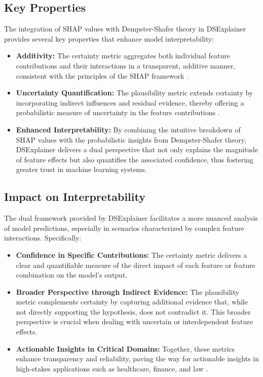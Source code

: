 \documentclass[acmlarge]{acmart}
\begin{document}
\subsection{Key Properties}

The integration of SHAP values with Dempster-Shafer theory in DSExplainer provides several key properties that enhance model interpretability:

\begin{itemize}
    \item \textbf{Additivity:} The certainty metric aggregates both individual feature contributions and their interactions in a transparent, additive manner, consistent with the principles of the SHAP framework \cite{shapley1953value}.
    \item \textbf{Uncertainty Quantification:} The plausibility metric extends certainty by incorporating indirect influences and residual evidence, thereby offering a probabilistic measure of uncertainty in the feature contributions \cite{shafer1976mathematical}.
    \item \textbf{Enhanced Interpretability:} By combining the intuitive breakdown of SHAP values with the probabilistic insights from Dempster-Shafer theory, DSExplainer delivers a dual perspective that not only explains the magnitude of feature effects but also quantifies the associated confidence, thus fostering greater trust in machine learning systems.
\end{itemize}

\subsection{Impact on Interpretability}

The dual framework provided by DSExplainer facilitates a more nuanced analysis of model predictions, especially in scenarios characterized by complex feature interactions. Specifically:

\begin{itemize}
    \item \textbf{Confidence in Specific Contributions:} The certainty metric delivers a clear and quantifiable measure of the direct impact of each feature or feature combination on the model's output.
    \item \textbf{Broader Perspective through Indirect Evidence:} The plausibility metric complements certainty by capturing additional evidence that, while not directly supporting the hypothesis, does not contradict it. This broader perspective is crucial when dealing with uncertain or interdependent feature effects.
    \item \textbf{Actionable Insights in Critical Domains:} Together, these metrics enhance transparency and reliability, paving the way for actionable insights in high-stakes applications such as healthcare, finance, and law \cite{zhang2021evidential}.
\end{itemize}
\end{document}
